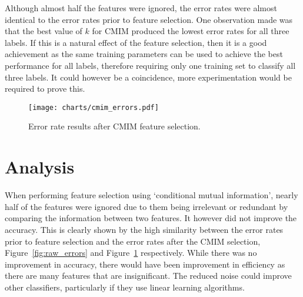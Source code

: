 Although almost half the features were ignored, the error rates were almost identical to the error rates prior to feature
selection. One observation made was that the best value of $k$ for CMIM produced the lowest error rates for all three labels.
If this is a natural effect of the feature selection, then it is a good achievement as the same training parameters can be used
to achieve the best performance for all labels, therefore requiring only one training set to classify all three labels. It could
however be a coincidence, more experimentation would be required to prove this.

\begin{figure}[h]
    \centering
    \texttt{[image: charts/cmim\_errors.pdf]}
    \caption{Error rate results after CMIM feature selection.}
    \label{fig:cmim_errors}
\end{figure}

\section{Analysis}
\todo{}

When performing feature selection using `conditional mutual information', nearly half of the features were ignored due to them
being irrelevant or redundant by comparing the information between two features. It however did not improve the accuracy. This
is clearly shown by the high similarity between the error rates prior to feature selection and the error rates after the CMIM
selection, Figure~\ref{fig:raw_errors} and Figure~\ref{fig:cmim_errors} respectively. While there was no improvement in
accuracy, there would have been improvement in efficiency as there are many features that are insignificant. The reduced noise
could improve other classifiers, particularly if they use linear learning algorithms.



